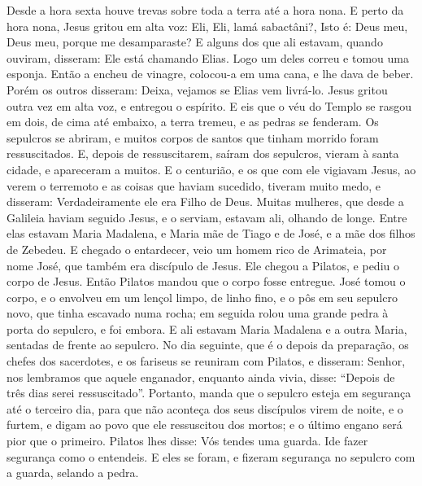 {  Desde a hora sexta
 houve trevas sobre toda a terra até a hora nona.
  E perto da hora nona, Jesus gritou em alta voz: Eli, Eli, lamá sabactâni?, Isto é: Deus meu, Deus meu, porque me desamparaste?
  E alguns dos que ali estavam, quando ouviram, disseram: Ele está chamando Elias.
  Logo um deles correu e tomou uma esponja. Então a encheu de vinagre, colocou-a em uma cana, e lhe dava de beber.
  Porém os outros disseram: Deixa, vejamos se Elias vem livrá-lo.
  Jesus gritou outra vez em alta voz, e entregou o espírito.
  E eis que o véu do Templo se rasgou em dois, de cima até embaixo, a terra tremeu, e as pedras se fenderam.
  Os sepulcros se abriram, e muitos corpos de santos que tinham morrido
 foram ressuscitados.
  E, depois de ressuscitarem, saíram dos sepulcros, vieram à santa cidade,
 e apareceram a muitos.
  E o centurião, e os que com ele vigiavam Jesus, ao verem o terremoto e as coisas que haviam sucedido, tiveram muito medo, e disseram: Verdadeiramente ele era Filho de Deus.
  Muitas mulheres, que desde a Galileia haviam seguido Jesus, e o serviam, estavam ali, olhando de longe.
  Entre elas estavam Maria Madalena, e Maria mãe de Tiago e de José, e a mãe dos filhos de Zebedeu.
  E chegado o entardecer, veio um homem rico de Arimateia, por nome José, que também era discípulo de Jesus.
  Ele chegou a Pilatos, e pediu o corpo de Jesus. Então Pilatos mandou que o corpo
{} fosse entregue.
  José tomou o corpo, e o envolveu em um lençol limpo, de linho fino,
  e o pôs em seu sepulcro novo, que tinha escavado numa rocha; em seguida rolou uma grande pedra à porta do sepulcro, e foi embora.
  E ali estavam Maria Madalena e a outra Maria, sentadas de frente ao sepulcro.
  No dia seguinte, que é o depois da preparação, os chefes dos sacerdotes, e os fariseus se reuniram com Pilatos,
  e disseram: Senhor, nos lembramos que aquele enganador, enquanto ainda vivia, disse: “Depois de três dias serei ressuscitado”.
  Portanto, manda que o sepulcro esteja em segurança até o terceiro dia, para que não aconteça dos seus discípulos virem de noite, e o furtem, e digam ao povo que ele ressuscitou dos mortos; e
{} o último engano será pior que o primeiro.
  Pilatos lhes disse: Vós tendes uma guarda. Ide fazer segurança como o entendeis.
  E eles se foram, e fizeram segurança no sepulcro com a guarda, selando a pedra.
\par }

